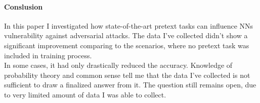 \paragraph{Conslusion}
In this paper I investigated how state-of-the-art pretext tasks can influence NNs vulnerability against adversarial attacks.
The data I've collected didn't show a significant improvement comparing to the scenarios, where no pretext task was included
in training process. \\ In some cases, it had only drastically reduced the accuracy.
Knowledge of probability theory and common sense tell me that the data I've collected is not sufficient to
draw a finalized answer from it.
The question still remains open, due to very limited amount of data I was able to collect.
